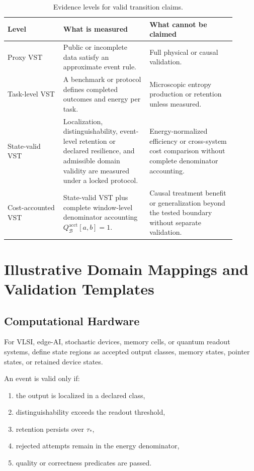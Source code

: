 \documentclass[11pt,a4paper]{article}
\newcommand{\1}{\mathbf{1}}
\begin{document}
\begin{table}[h]
\centering
\caption{Evidence levels for valid transition claims.}
\label{tab:evidence-levels}
\begin{tabular}{p{0.22\linewidth}p{0.34\linewidth}p{0.34\linewidth}}
\toprule
Level & What is measured & What cannot be claimed \\
\midrule
Proxy VST & Public or incomplete data satisfy an approximate event rule. & Full physical or causal validation. \\
Task-level VST & A benchmark or protocol defines completed outcomes and energy per task. & Microscopic entropy production or retention unless measured. \\
State-valid VST & Localization, distinguishability, event-level retention or declared resilience, and admissible domain validity are measured under a locked protocol. & Energy-normalized efficiency or cross-system cost comparison without complete denominator accounting. \\
Cost-accounted VST & State-valid VST plus complete window-level denominator accounting $Q_{\mathcal{B}}^{\mathrm{acct}}[a,b]=1$. & Causal treatment benefit or generalization beyond the tested boundary without separate validation. \\
\bottomrule
\end{tabular}
\end{table}

\section{Illustrative Domain Mappings and Validation Templates}

\subsection{Computational Hardware}

For VLSI, edge-AI, stochastic devices, memory cells, or quantum readout systems, define state regions as accepted output classes, memory states, pointer states, or retained device states.

An event is valid only if:
\begin{enumerate}
  \item the output is localized in a declared class,
  \item distinguishability exceeds the readout threshold,
  \item retention persists over $\tau_\ast$,
  \item rejected attempts remain in the energy denominator,
  \item quality or correctness predicates are passed.
\end{enumerate}
\end{document}
